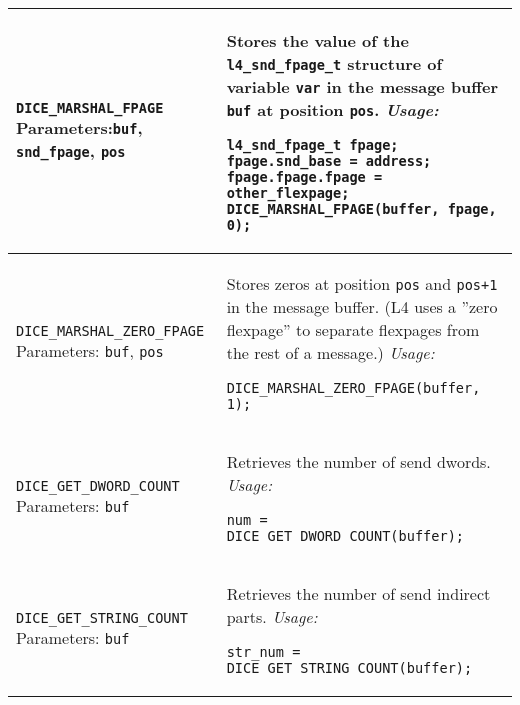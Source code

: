 {\begin{longtable}{|p{4.5cm}|p{9cm}|}
\verb|DICE_MARSHAL_FPAGE|
\newline
Parameters:\verb|buf|, \verb|snd_fpage|, \verb|pos| &
Stores the value of the \verb|l4_snd_fpage_t| structure of
variable \verb|var| in the message buffer \verb|buf| at
position \verb|pos|.
\newline
\it Usage:
\begin{verbatim}
l4_snd_fpage_t fpage;
fpage.snd_base = address;
fpage.fpage.fpage = other_flexpage;
DICE_MARSHAL_FPAGE(buffer, fpage, 0);
\end{verbatim}
\\ \hline

\verb|DICE_MARSHAL_ZERO_FPAGE|
\newline
Parameters: \verb|buf|, \verb|pos| &
Stores zeros at position \verb|pos| and \verb|pos+1| in the
message buffer. (L4 uses a ''zero flexpage'' to separate
flexpages from the rest of a message.)
\newline
\it Usage:
\begin{verbatim}
DICE_MARSHAL_ZERO_FPAGE(buffer, 1);
\end{verbatim}
\\ \hline

\verb|DICE_GET_DWORD_COUNT|
\newline
Parameters: \verb|buf| &
Retrieves the number of send dwords.
\newline
\it Usage:
\begin{verbatim}
num = DICE_GET_DWORD_COUNT(buffer);
\end{verbatim}
\\ \hline

\verb|DICE_GET_STRING_COUNT|
\newline
Parameters: \verb|buf| &
Retrieves the number of send indirect parts.
\newline
\it Usage:
\begin{verbatim}
str_num = DICE_GET_STRING_COUNT(buffer);
\end{verbatim}
\\ \hline


\end{longtable}}
